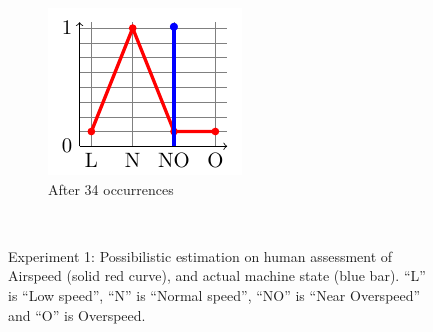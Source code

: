 \begin{figure}
\begin{subfigure}[b]{.15\linewidth}
\includegraphics[width=\linewidth]{plot_tikz/speed28CONF.pdf}
\caption{After 34 occurrences}
\label{fig:speed34}
\end{subfigure}
\\
\vspace{0.5cm}
\caption[Possibilistic estimation on human assessment: experiment 1]{Experiment 1: Possibilistic estimation on human assessment of Airspeed (solid red curve), and actual machine state (blue bar). ``L'' is ``Low speed'', ``N'' is ``Normal speed'', ``NO'' is ``Near Overspeed'' and ``O'' is Overspeed.}
\label{fig:SpeedB}
\end{figure}

